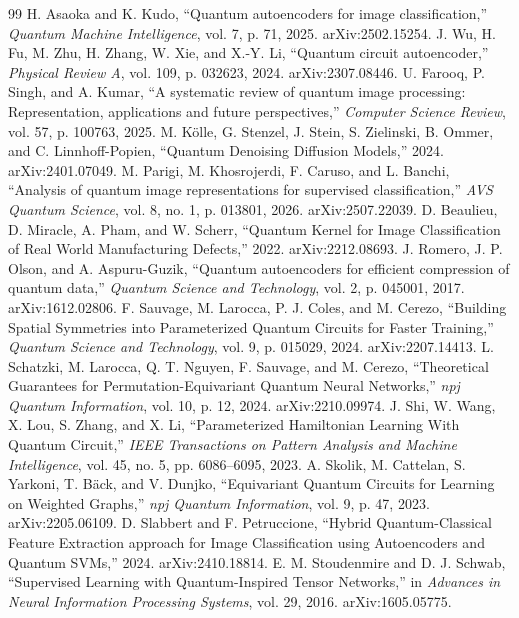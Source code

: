 \documentclass[11pt]{article}
\begin{document}
\begin{thebibliography}{99}
 H. Asaoka and K. Kudo, ``Quantum autoencoders for image classification,'' \textit{Quantum Machine Intelligence}, vol. 7, p. 71, 2025. arXiv:2502.15254.
 J. Wu, H. Fu, M. Zhu, H. Zhang, W. Xie, and X.-Y. Li, ``Quantum circuit autoencoder,'' \textit{Physical Review A}, vol. 109, p. 032623, 2024. arXiv:2307.08446.
 U. Farooq, P. Singh, and A. Kumar, ``A systematic review of quantum image processing: Representation, applications and future perspectives,'' \textit{Computer Science Review}, vol. 57, p. 100763, 2025.
 M. K\"olle, G. Stenzel, J. Stein, S. Zielinski, B. Ommer, and C. Linnhoff-Popien, ``Quantum Denoising Diffusion Models,'' 2024. arXiv:2401.07049.
 M. Parigi, M. Khosrojerdi, F. Caruso, and L. Banchi, ``Analysis of quantum image representations for supervised classification,'' \textit{AVS Quantum Science}, vol. 8, no. 1, p. 013801, 2026. arXiv:2507.22039.
 D. Beaulieu, D. Miracle, A. Pham, and W. Scherr, ``Quantum Kernel for Image Classification of Real World Manufacturing Defects,'' 2022. arXiv:2212.08693.
 J. Romero, J. P. Olson, and A. Aspuru-Guzik, ``Quantum autoencoders for efficient compression of quantum data,'' \textit{Quantum Science and Technology}, vol. 2, p. 045001, 2017. arXiv:1612.02806.
 F. Sauvage, M. Larocca, P. J. Coles, and M. Cerezo, ``Building Spatial Symmetries into Parameterized Quantum Circuits for Faster Training,'' \textit{Quantum Science and Technology}, vol. 9, p. 015029, 2024. arXiv:2207.14413.
 L. Schatzki, M. Larocca, Q. T. Nguyen, F. Sauvage, and M. Cerezo, ``Theoretical Guarantees for Permutation-Equivariant Quantum Neural Networks,'' \textit{npj Quantum Information}, vol. 10, p. 12, 2024. arXiv:2210.09974.
 J. Shi, W. Wang, X. Lou, S. Zhang, and X. Li, ``Parameterized Hamiltonian Learning With Quantum Circuit,'' \textit{IEEE Transactions on Pattern Analysis and Machine Intelligence}, vol. 45, no. 5, pp. 6086--6095, 2023.
 A. Skolik, M. Cattelan, S. Yarkoni, T. B\"ack, and V. Dunjko, ``Equivariant Quantum Circuits for Learning on Weighted Graphs,'' \textit{npj Quantum Information}, vol. 9, p. 47, 2023. arXiv:2205.06109.
 D. Slabbert and F. Petruccione, ``Hybrid Quantum-Classical Feature Extraction approach for Image Classification using Autoencoders and Quantum SVMs,'' 2024. arXiv:2410.18814.
 E. M. Stoudenmire and D. J. Schwab, ``Supervised Learning with Quantum-Inspired Tensor Networks,'' in \textit{Advances in Neural Information Processing Systems}, vol. 29, 2016. arXiv:1605.05775.

\end{thebibliography}
\end{document}
